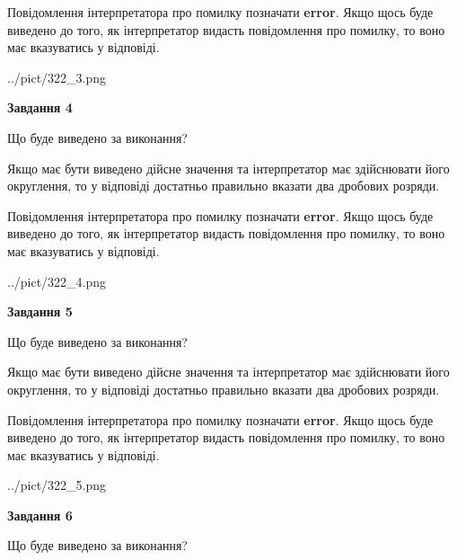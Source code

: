\documentclass[12pt, ukrainian]{article}
\begin{document}
{\begin {Large}
Повідомлення інтерпретатора про помилку позначати \textbf{error}.
Якщо щось буде виведено до того, як інтерпретатор видасть повідомлення про помилку, 
то воно має вказуватись у відповіді. \par

\begin{center}
	{../pict/322_3.png}
\end{center}
\newpage

{\begin {center}\textbf{Завдання 4}\end {center}}\par
Що буде виведено за виконання? \par

Якщо має бути виведено дійсне значення та інтерпретатор має здійснювати його округлення, 
то у відповіді достатньо правильно вказати два дробових розряди.

Повідомлення інтерпретатора про помилку позначати \textbf{error}.
Якщо щось буде виведено до того, як інтерпретатор видасть повідомлення про помилку, 
то воно має вказуватись у відповіді. \par

\begin{center}
	{../pict/322_4.png}
\end{center}
\newpage

{\begin {center}\textbf{Завдання 5}\end {center}}\par
Що буде виведено за виконання? \par

Якщо має бути виведено дійсне значення та інтерпретатор має здійснювати його округлення, 
то у відповіді достатньо правильно вказати два дробових розряди.

Повідомлення інтерпретатора про помилку позначати \textbf{error}.
Якщо щось буде виведено до того, як інтерпретатор видасть повідомлення про помилку, 
то воно має вказуватись у відповіді. \par

\begin{center}
	{../pict/322_5.png}
\end{center}
\newpage

{\begin {center}\textbf{Завдання 6}\end {center}}\par
Що буде виведено за виконання? \par


\end{Large}}
\end{document}
